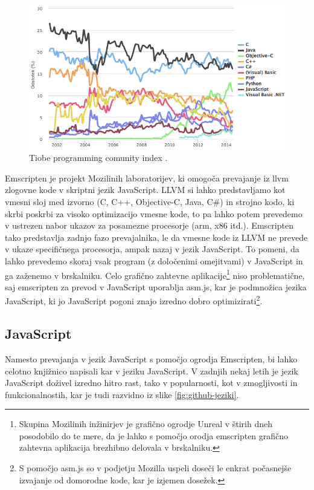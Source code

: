 \begin{figure}
 \includegraphics[width=\linewidth]{tiobe-index}
 \caption{Tiobe programming comunity index \cite{tiobe}.}
 \label{fig:tiobe-index}
\end{figure}

Emscripten je projekt Mozilinih laboratorijev, ki omogoča prevajanje iz \gls{llvm} zlogovne kode v skriptni jezik JavaScript. LLVM si lahko predstavljamo kot vmesni sloj med izvorno (C, C++, Objective-C, Java, C\#) in strojno kodo, ki skrbi poskrbi za visoko optimizacijo vmesne kode, to pa lahko potem prevedemo v ustrezen nabor ukazov za posamezne procesorje (\gls{arm}, x86 itd.). Emscripten tako predstavlja zadnjo fazo prevajalnika, le da vmesne kode iz LLVM ne prevede v ukaze specifičnega procesorja, ampak nazaj v jezik JavaScript. To pomeni, da lahko prevedemo skoraj vsak program (z določenimi omejitvami) v JavaScript in ga zaženemo v brskalniku. Celo grafično zahtevne aplikacije\footnote{Skupina Mozilinih inžinirjev je grafično ogrodje Unreal v štirih dneh posodobilo do te mere, da je lahko s pomočjo orodja emscripten grafično zahtevna aplikacija brezhibno delovala v brskalniku\cite{epic-citadel}.} niso problematične, saj emscripten za prevod v JavaScript uporablja asm.js\cite{asmjs}, kar je podmnožica jezika JavaScript, ki jo JavaScript pogoni znajo izredno dobro optimizirati\footnote{S pomočjo asm.js so v podjetju Mozilla uspeli doseči le enkrat počasnejše izvajanje od domorodne kode, kar je izjemen dosežek.\cite{mozilla-asmjs}}.

\subsection{JavaScript}
\label{chap:javascript}

Namesto prevajanja v jezik JavaScript s pomočjo ogrodja Emscripten, bi lahko celotno knjižnico napisali kar v jeziku JavaScript. V zadnjih nekaj letih je jezik JavaScript doživel izredno hitro rast, tako v popularnosti, kot v zmogljivosti in funkcionalnostih, kar je tudi razvidno iz slike \ref{fig:github-jeziki}.

